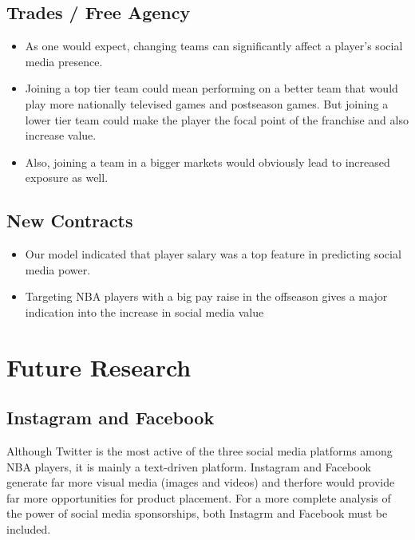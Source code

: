 \documentclass[11pt]{article}
\providecommand{\tightlist}{%
      \setlength{\itemsep}{0pt}\setlength{\parskip}{0pt}}
\begin{document}
\subsection{Trades / Free Agency}\label{trades-free-agency}

\begin{itemize}
\tightlist
\item
  As one would expect, changing teams can significantly affect a
  player's social media presence.
\item
  Joining a top tier team could mean performing on a better team that
  would play more nationally televised games and postseason games. But
  joining a lower tier team could make the player the focal point of the
  franchise and also increase value.
\item
  Also, joining a team in a bigger markets would obviously lead to
  increased exposure as well.
\end{itemize}

\subsection{New Contracts}\label{new-contracts}

\begin{itemize}
\tightlist
\item
  Our model indicated that player salary was a top feature in predicting
  social media power.
\item
  Targeting NBA players with a big pay raise in the offseason gives a
  major indication into the increase in social media value
\end{itemize}

    \section{Future Research}\label{future-research}

\subsection{Instagram and Facebook}\label{instagram-and-facebook}

Although Twitter is the most active of the three social media platforms
among NBA players, it is mainly a text-driven platform. Instagram and
Facebook generate far more visual media (images and videos) and therfore
would provide far more opportunities for product placement. For a more
complete analysis of the power of social media sponsorships, both
Instagrm and Facebook must be included.
\end{document}
